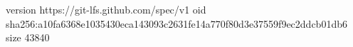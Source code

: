 version https://git-lfs.github.com/spec/v1
oid sha256:a10fa6368e1035430eca143093c2631fe14a770f80d3e37559f9ec2ddcb01db6
size 43840
